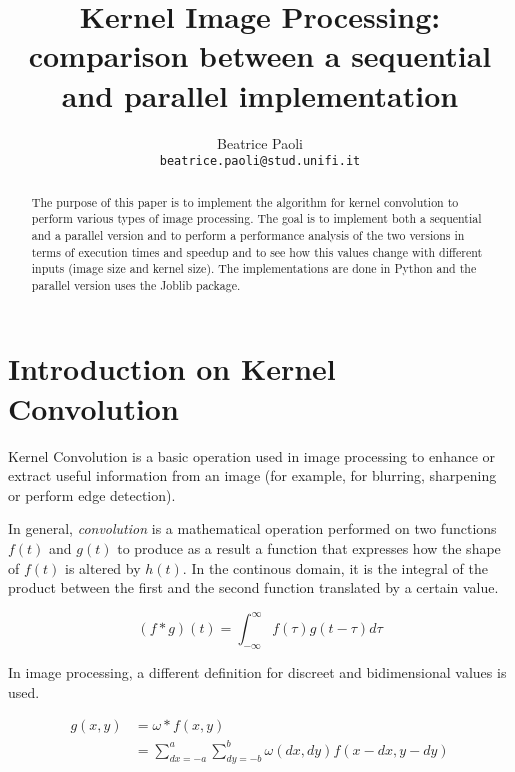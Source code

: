 \documentclass[10pt,twocolumn,letterpaper]{article}
\begin{document}
\title{Kernel Image Processing: comparison between a sequential and parallel implementation}

\author{Beatrice Paoli\\
{\tt\small beatrice.paoli@stud.unifi.it}
}

\maketitle
\thispagestyle{empty}

\begin{abstract}
	The purpose of this paper is to implement the algorithm for kernel convolution to perform various types of image processing. The goal is to implement both a sequential and a parallel version and to perform a performance analysis of the two versions in terms of execution times and speedup and to see how this values change with different inputs (image size and kernel size). The implementations are done in Python and the parallel version uses the Joblib package.
\end{abstract}


\section{Introduction on Kernel Convolution}

Kernel Convolution is a basic operation used in image processing to enhance or extract useful information from an image (for example, for blurring, sharpening or perform edge detection).

In general, \textit{convolution} is a mathematical operation performed on two functions $f(t)$ and $g(t)$ to produce as a result a function that expresses how the shape of $f(t)$ is altered by $h(t)$. In the continous domain, it is the integral of the product between the first and the second function translated by a certain value.

\[(f*g)(t) = \int_{-\infty}^{\infty}f(\tau)g(t - \tau)d\tau\]

In image processing, a different definition for discreet and bidimensional values is used.

\begin{equation*}\begin{split} g(x, y) & = \omega * f(x, y) \\ & = \sum_{dx = -a}^{a}\sum_{dy = -b}^{b}\omega(dx, dy)f(x - dx, y - dy)\end{split}\end{equation*}
\end{document}
